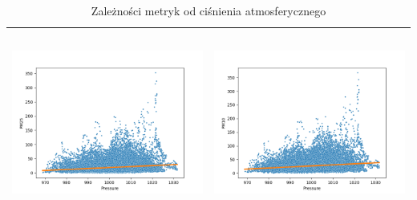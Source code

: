 \documentclass[18pt, letterpaper]{article}
\begin{document}
\begin{table}[H]
\begin{tabular}{|c|c|}
\includegraphics[width=80mm,height=60mm]{visualisations/corr_plots/PressurexPM25_scatter.png}  & \includegraphics[width=80mm,height=60mm]{visualisations/corr_plots/PressurexPM10_scatter.png} \\ \hline
\end{tabular}
\caption{Zależności metryk od ciśnienia atmosferycznego}
\label{table:pressure}
\end{table}
\end{document}
